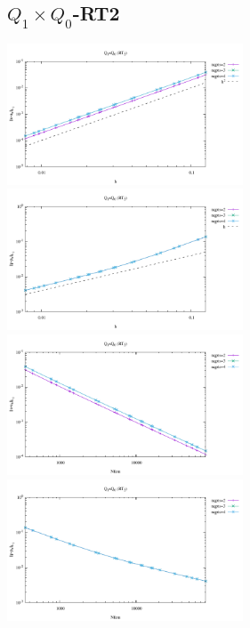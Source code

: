 \subsection*{$Q_1\times Q_0$-RT2}
\begin{center}
\includegraphics[width=7cm]{python_codes/fieldstone_120/results/RT2Q0-velocity-h.pdf}
\includegraphics[width=7cm]{python_codes/fieldstone_120/results/RT2Q0-pressure-h.pdf}
\includegraphics[width=7cm]{python_codes/fieldstone_120/results/RT2Q0-velocity-Nfem.pdf}
\includegraphics[width=7cm]{python_codes/fieldstone_120/results/RT2Q0-pressure-Nfem.pdf}
\end{center}

